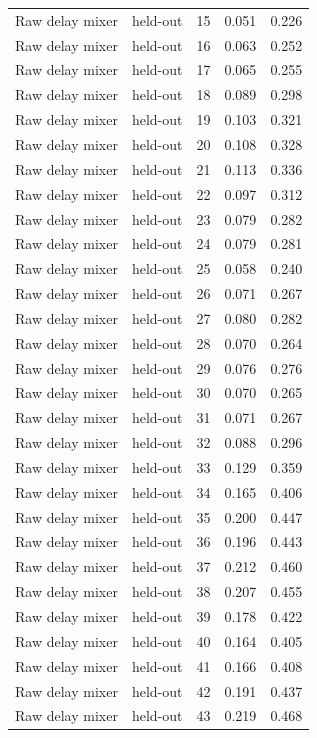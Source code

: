 \begin{tabular}{llrrr}
Raw delay mixer & held-out & 15 & 0.051 & 0.226 \\
Raw delay mixer & held-out & 16 & 0.063 & 0.252 \\
Raw delay mixer & held-out & 17 & 0.065 & 0.255 \\
Raw delay mixer & held-out & 18 & 0.089 & 0.298 \\
Raw delay mixer & held-out & 19 & 0.103 & 0.321 \\
Raw delay mixer & held-out & 20 & 0.108 & 0.328 \\
Raw delay mixer & held-out & 21 & 0.113 & 0.336 \\
Raw delay mixer & held-out & 22 & 0.097 & 0.312 \\
Raw delay mixer & held-out & 23 & 0.079 & 0.282 \\
Raw delay mixer & held-out & 24 & 0.079 & 0.281 \\
Raw delay mixer & held-out & 25 & 0.058 & 0.240 \\
Raw delay mixer & held-out & 26 & 0.071 & 0.267 \\
Raw delay mixer & held-out & 27 & 0.080 & 0.282 \\
Raw delay mixer & held-out & 28 & 0.070 & 0.264 \\
Raw delay mixer & held-out & 29 & 0.076 & 0.276 \\
Raw delay mixer & held-out & 30 & 0.070 & 0.265 \\
Raw delay mixer & held-out & 31 & 0.071 & 0.267 \\
Raw delay mixer & held-out & 32 & 0.088 & 0.296 \\
Raw delay mixer & held-out & 33 & 0.129 & 0.359 \\
Raw delay mixer & held-out & 34 & 0.165 & 0.406 \\
Raw delay mixer & held-out & 35 & 0.200 & 0.447 \\
Raw delay mixer & held-out & 36 & 0.196 & 0.443 \\
Raw delay mixer & held-out & 37 & 0.212 & 0.460 \\
Raw delay mixer & held-out & 38 & 0.207 & 0.455 \\
Raw delay mixer & held-out & 39 & 0.178 & 0.422 \\
Raw delay mixer & held-out & 40 & 0.164 & 0.405 \\
Raw delay mixer & held-out & 41 & 0.166 & 0.408 \\
Raw delay mixer & held-out & 42 & 0.191 & 0.437 \\
Raw delay mixer & held-out & 43 & 0.219 & 0.468 \\

\end{tabular}
